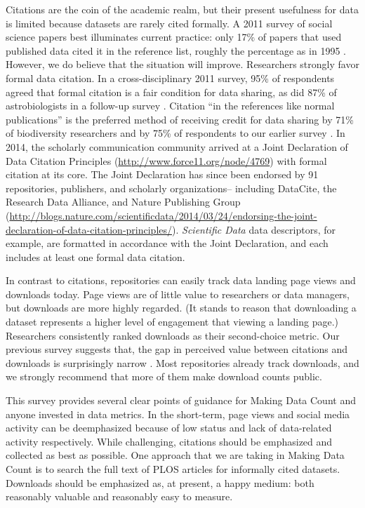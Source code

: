 \documentclass[english]{article}
\begin{document}

Citations are the coin of the academic realm, but their present usefulness for data is limited because datasets are rarely cited formally.
A 2011 survey of social science papers best illuminates current practice: only 17\% of papers that used published data cited it in the reference list, roughly the percentage as in 1995 \cite{sieber_not_1995, mooney_citing_2011}. 
However, we do believe that the situation will improve. 
Researchers strongly favor formal data citation.
In a cross-disciplinary 2011 survey, 95\% of respondents agreed that formal citation is a fair condition for data sharing, as did 87\% of astrobiologists in a follow-up survey \cite{tenopir_data_2011, aydinoglu_data_2014}. 
Citation ``in the references like normal publications'' is the preferred method of receiving credit for data sharing by 71\% of biodiversity researchers and by 75\% of respondents to our earlier survey \cite{enke_users_2012, kratz_researcher_2015}.
In 2014, the scholarly communication community arrived at a Joint Declaration of Data Citation Principles (\url{http://www.force11.org/node/4769}) with formal citation at its core. 
The Joint Declaration has since been endorsed by 91 repositories, publishers, and scholarly organizations-- including DataCite, the Research Data Alliance, and Nature Publishing Group (\url{http://blogs.nature.com/scientificdata/2014/03/24/endorsing-the-joint-declaration-of-data-citation-principles/}).
\emph{Scientific Data} data descriptors, for example, are formatted in accordance with the Joint Declaration, and each includes at least one formal data citation.

In contrast to citations, repositories can easily track data landing page views and downloads today.
Page views are of little value to researchers or data managers, but downloads are more highly regarded.
(It stands to reason that downloading a dataset represents a higher level of engagement that viewing a landing page.)
Researchers consistently ranked downloads as their second-choice metric.
Our previous survey suggests that, the gap in perceived value between citations and downloads is surprisingly narrow \cite{kratz_researcher_2015}.
Most repositories already track downloads, and we strongly recommend that more of them make download counts public.

This survey provides several clear points of guidance for Making Data Count and anyone invested in data metrics.
In the short-term, page views and social media activity can be deemphasized because of low status and lack of data-related activity respectively.
While challenging, citations should be emphasized and collected as best as possible.
One approach that we are taking in Making Data Count is to search the full text of PLOS articles for informally cited datasets.
Downloads should be emphasized as, at present, a happy medium: both reasonably valuable and reasonably easy to measure.
\end{document}
